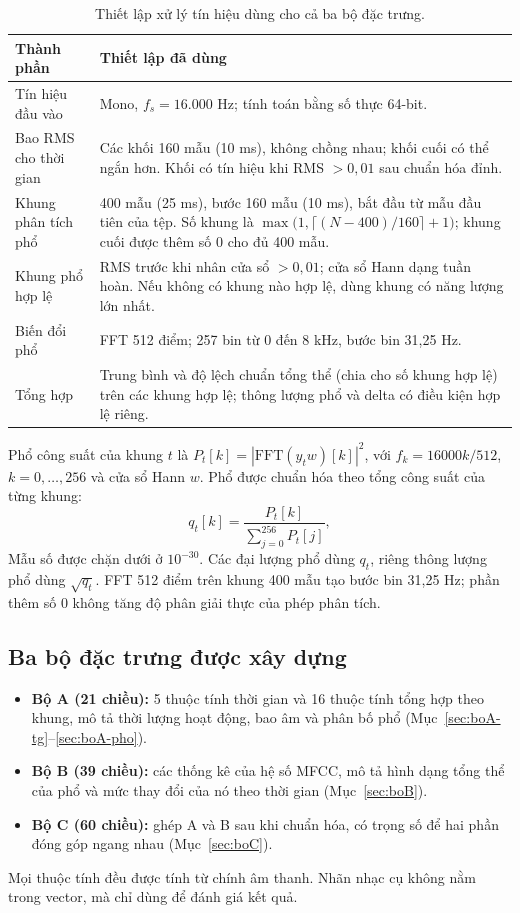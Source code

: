\documentclass[11pt,a4paper]{article}
\begin{document}
\begin{table}[htbp]
\centering\small
\caption{Thiết lập xử lý tín hiệu dùng cho cả ba bộ đặc trưng.}\label{tab:thietlap}
\begin{tabularx}{\textwidth}{p{}X}
\toprule
Thành phần & Thiết lập đã dùng\\\midrule
Tín hiệu đầu vào & Mono, $f_s=16.000$ Hz; tính toán bằng số thực 64-bit.\\
Bao RMS cho thời gian & Các khối 160 mẫu (10 ms), không chồng nhau; khối cuối có thể ngắn hơn. Khối có tín hiệu khi RMS $>0{,}01$ sau chuẩn hóa đỉnh.\\
Khung phân tích phổ & 400 mẫu (25 ms), bước 160 mẫu (10 ms), bắt đầu từ mẫu đầu tiên của tệp. Số khung là $\max\big(1,\lceil(N-400)/160\rceil+1\big)$; khung cuối được thêm số 0 cho đủ 400 mẫu.\\
Khung phổ hợp lệ & RMS trước khi nhân cửa sổ $>0{,}01$; cửa sổ Hann dạng tuần hoàn. Nếu không có khung nào hợp lệ, dùng khung có năng lượng lớn nhất.\\
Biến đổi phổ & FFT 512 điểm; 257 bin từ 0 đến 8 kHz, bước bin 31,25 Hz.\\
Tổng hợp & Trung bình và độ lệch chuẩn tổng thể (chia cho số khung hợp lệ) trên các khung hợp lệ; thông lượng phổ và delta có điều kiện hợp lệ riêng.\\\bottomrule
\end{tabularx}
\end{table}
Phổ công suất của khung $t$ là $P_t[k]=|\mathrm{FFT}(y_t w)[k]|^2$, với $f_k=16000k/512$, $k=0,\ldots,256$ và cửa sổ Hann $w$. Phổ được chuẩn hóa theo tổng công suất của từng khung:
\[
q_t[k]=\frac{P_t[k]}{\sum_{j=0}^{256}P_t[j]},
\]
Mẫu số được chặn dưới ở $10^{-30}$. Các đại lượng phổ dùng $q_t$, riêng thông lượng phổ dùng $\sqrt{q_t}$. FFT 512 điểm trên khung 400 mẫu tạo bước bin 31,25 Hz; phần thêm số 0 không tăng độ phân giải thực của phép phân tích.

\subsection{Ba bộ đặc trưng được xây dựng}
\begin{itemize}
\item \textbf{Bộ A (21 chiều):} 5 thuộc tính thời gian và 16 thuộc tính tổng hợp theo khung, mô tả thời lượng hoạt động, bao âm và phân bố phổ (Mục~\ref{sec:boA-tg}--\ref{sec:boA-pho}).
\item \textbf{Bộ B (39 chiều):} các thống kê của hệ số MFCC, mô tả hình dạng tổng thể của phổ và mức thay đổi của nó theo thời gian (Mục~\ref{sec:boB}).
\item \textbf{Bộ C (60 chiều):} ghép A và B sau khi chuẩn hóa, có trọng số để hai phần đóng góp ngang nhau (Mục~\ref{sec:boC}).
\end{itemize}
Mọi thuộc tính đều được tính từ chính âm thanh. Nhãn nhạc cụ không nằm trong vector, mà chỉ dùng để đánh giá kết quả.
\end{document}
